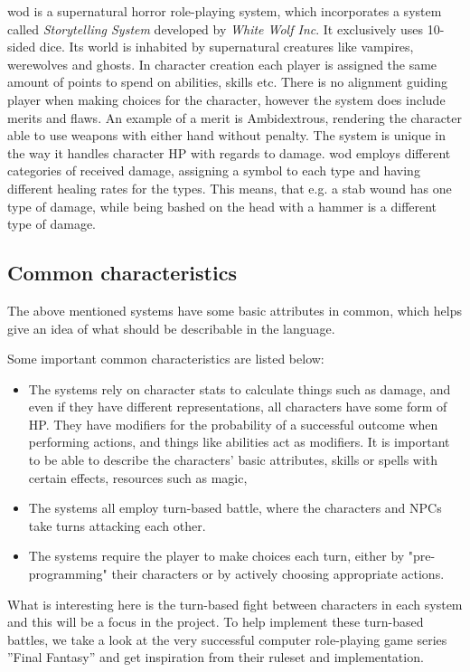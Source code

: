 \ac{wod} is a supernatural horror role-playing system, which incorporates a system called \emph{Storytelling System} developed by \emph{White Wolf Inc}. It exclusively uses 10-sided dice\cite{Appelcline2007}. Its world is inhabited by supernatural creatures like vampires, werewolves and ghosts. In character creation each player is assigned the same amount of points to spend on abilities, skills etc. There is no alignment guiding player when making choices for the character, however the system does include merits and flaws. An example of a merit is Ambidextrous, rendering the character able to use weapons with either hand without penalty. The system is unique in the way it handles character HP with regards to damage. \ac{wod} employs different categories of received damage, assigning a symbol to each type and having different healing rates for the types.\cite{wod} This means, that e.g. a stab wound has one type of damage, while being bashed on the head with a hammer is a different type of damage.

\subsection{Common characteristics}
\label{baseclasses}
The above mentioned systems have some basic attributes in common, which helps give an idea of what should be describable in the language.

Some important common characteristics are listed below:
\begin{itemize}
	\item The systems rely on character stats to calculate things such as damage, and even if they have different representations, all characters have some form of HP. They have modifiers for the probability of a successful outcome when performing actions, and things like abilities act as modifiers. It is important to be able to describe the characters' basic attributes, skills or spells with certain effects, resources such as magic, 
	\item The systems all employ turn-based battle, where the characters and NPCs take turns attacking each other. 
	\item The systems require the player to make choices each turn, either by "pre-programming" their characters or by actively choosing appropriate actions.
\end{itemize}

What is interesting here is the turn-based fight between characters in each system and this will be a focus in the project.
To help implement these turn-based battles, we take a look at the very successful computer role-playing game series ''Final Fantasy'' and get inspiration from their ruleset and implementation.

